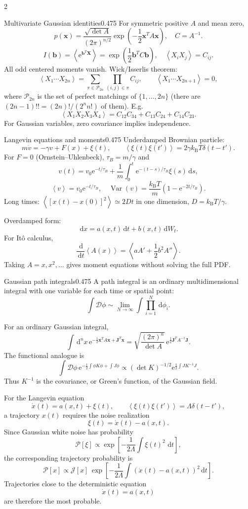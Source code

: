 \documentclass[8pt,a4paper]{extarticle}
\newcommand{\dd}{\,\mathrm d}
\newcommand{\avg}[1]{\left\langle #1\right\rangle}
\newcommand{\Var}{\operatorname{Var}}
\newcommand{\e}{\mathrm e}
\newcommand{\kb}{k_{\mathrm B}}
\begin{document}
\begin{multicols*}{2}
\begin{mytikzbox}{Multivariate Gaussian identities}{0.475}
For symmetric positive $A$ and mean zero,
\[
p(\bm x)=\frac{\sqrt{\det A}}{(2\pi)^{n/2}}
\exp\!\left(-\frac12\bm x^TA\bm x\right),
\quad C=A^{-1}.
\]
\[
I(\bm b)=\avg{\e^{\bm b^T\bm X}}
=\exp\!\left(\frac12\bm b^TC\bm b\right),
\quad \avg{X_iX_j}=C_{ij}.
\]
All odd centered moments vanish. Wick/Isserlis theorem:
\[
\avg{X_1\cdots X_{2n}}
=\sum_{\pi\in\mathcal P_{2n}}
\prod_{(i,j)\in\pi}C_{ij},
\qquad
\avg{X_1\cdots X_{2n+1}}=0,
\]
where \(\mathcal P_{2n}\) is the set of perfect matchings of \(\{1,\ldots,2n\}\)
(there are $(2n-1)!!=(2n)!/(2^n n!)$ of them). E.g.\
\[
\avg{X_1X_2X_3X_4}=C_{12}C_{34}+C_{13}C_{24}+C_{14}C_{23}.
\]
For Gaussian variables, zero covariance implies independence.
\end{mytikzbox} 

\begin{mytikzbox}{Langevin equations and moments}{0.475}
Underdamped Brownian particle:
\[
m\dot v=-\gamma v+F(x)+\xi(t),
\qquad \avg{\xi(t)\xi(t')}=2\gamma\kb T\delta(t-t').
\]
For $F=0$ (Ornstein--Uhlenbeck), $\tau_B=m/\gamma$ and
\[
v(t)=v_0\e^{-t/\tau_B}+\frac1m\int_0^t
\e^{-(t-s)/\tau_B}\xi(s)\dd s,
\]
\[
\avg v=v_0\e^{-t/\tau_B},
\quad
\Var(v)=\frac{\kb T}{m}\left(1-\e^{-2t/\tau_B}\right).
\]
Long times: $\avg{[x(t)-x(0)]^2}\simeq2Dt$ in one dimension,
$D=\kb T/\gamma$.

Overdamped form:
\[
\dd x=a(x,t)\dd t+b(x,t)\dd W_t.
\]
For It\^o calculus,
\[
\frac{\dd}{\dd t}\avg{A(x)}=
\avg{aA'+\frac12b^2A''}.
\]
Taking $A=x,x^2,\ldots$ gives moment equations without solving the full PDF.
\end{mytikzbox}

\begin{mytikzbox}{Gaussian path integrals}{0.475}
A path integral is an ordinary multidimensional integral with one variable for
each time or spatial point:
\[
\int \mathcal{D}\phi
\sim
\lim_{N\to\infty}\int\prod_{i=1}^{N}\dd\phi_i.
\]

For an ordinary Gaussian integral,
\[
\int \dd^n x\,
\e^{-\frac{1}{2}\bm{x}^{T}A\bm{x}+\bm{J}^{T}\bm{x}}
=
\sqrt{\frac{(2\pi)^n}{\det A}}\,
\e^{\frac{1}{2}\bm{J}^{T}A^{-1}\bm{J}}.
\]
The functional analogue is
\[
\int \mathcal{D}\phi\,
\e^{-\frac{1}{2}\int \phi K\phi+\int J\phi}
\propto
(\det K)^{-1/2}
\e^{\frac{1}{2}\int J K^{-1}J}.
\]
Thus \(K^{-1}\) is the covariance, or Green's function, of the Gaussian field.

For the Langevin equation
\[
\dot{x}(t)=a(x,t)+\xi(t),
\qquad
\avg{\xi(t)\xi(t')}=\Lambda\delta(t-t'),
\]
a trajectory \(x(t)\) requires the noise realization
\[
\xi(t)=\dot{x}(t)-a(x,t).
\]
Since Gaussian white noise has probability
\[
\mathcal{P}[\xi]
\propto
\exp\left[
-\frac{1}{2\Lambda}\int \xi(t)^2\,\dd t
\right],
\]
the corresponding trajectory probability is
\[
\mathcal{P}[x]
\propto
\mathcal{J}[x]\,
\exp\left[
-\frac{1}{2\Lambda}
\int
\left(\dot{x}(t)-a(x,t)\right)^2
\dd t
\right].
\]
Trajectories close to the deterministic equation
\[
\dot{x}(t)=a(x,t)
\]
are therefore the most probable.


\end{mytikzbox}
\end{multicols*}
\end{document}
